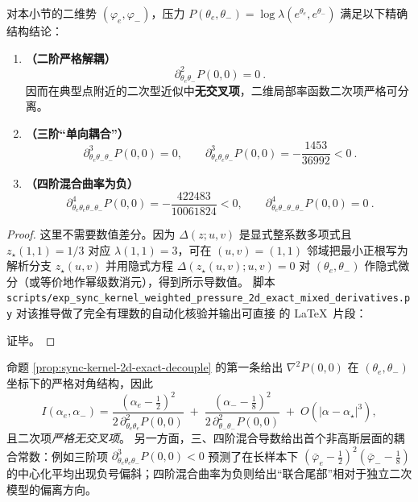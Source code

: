 \begin{proposition}[二维势的二阶严格解耦与首个非高斯混合项]\label{prop:sync-kernel-2d-exact-decouple}
对本小节的二维势 \((\varphi_e,\varphi_-)\)，压力
\(
P(\theta_e,\theta_-)=\log\lambda(e^{\theta_e},e^{\theta_-})
\)
满足以下精确结构结论：
\begin{enumerate}
  \item \textbf{（二阶严格解耦）}
  \[
  \boxed{\ \partial^2_{\theta_e\theta_-}P(0,0)=0\ }.
  \]
  因而在典型点附近的二次型近似中\textbf{无交叉项}，二维局部率函数二次项严格可分离。
  \item \textbf{（三阶“单向耦合”）}
  \[
  \boxed{\ \partial^3_{\theta_e\theta_-\theta_-}P(0,0)=0,\qquad
  \partial^3_{\theta_e\theta_e\theta_-}P(0,0)=-\frac{1453}{36992}<0\ }.
  \]
  \item \textbf{（四阶混合曲率为负）}
  \[
  \boxed{\ \partial^4_{\theta_e\theta_e\theta_-\theta_-}P(0,0)=-\frac{422483}{10061824}<0,\qquad
  \partial^4_{\theta_e\theta_-\theta_-\theta_-}P(0,0)=0\ }.
  \]
\end{enumerate}
\end{proposition}

\begin{proof}
这里不需要数值差分。因为 \(\Delta(z;u,v)\) 是显式整系数多项式且
\(
z_\star(1,1)=1/3
\)
对应 \(\lambda(1,1)=3\)，可在 \((u,v)=(1,1)\) 邻域把最小正根写为解析分支
\(
z_\star(u,v)
\)
并用隐式方程 \(\Delta(z_\star(u,v);u,v)=0\) 对 \((\theta_e,\theta_-)\) 作隐式微分（或等价地作幂级数消元），得到所示导数值。
脚本 \texttt{scripts/exp\_sync\_kernel\_weighted\_pressure\_2d\_exact\_mixed\_derivatives.py} 对该推导做了完全有理数的自动化核验并输出可直接 \verb|| 的 \LaTeX\ 片段：

证毕。
\end{proof}

\begin{remark}\label{rem:sync-kernel-2d-nongaussian-coupling}
命题 \ref{prop:sync-kernel-2d-exact-decouple} 的第一条给出
\(
\nabla^2 P(0,0)
\)
在 \((\theta_e,\theta_-)\) 坐标下的严格对角结构，因此
\[
I(\alpha_e,\alpha_-)
=\frac{(\alpha_e-\frac12)^2}{2\,\partial^2_{\theta_e\theta_e}P(0,0)}
\;+\;
\frac{(\alpha_--\frac18)^2}{2\,\partial^2_{\theta_-\theta_-}P(0,0)}
\;+\;O(|\alpha-\alpha_\star|^3),
\]
且二次项\emph{严格无交叉项}。
另一方面，三、四阶混合导数给出首个非高斯层面的耦合常数：例如三阶项
\(
\partial^3_{\theta_e\theta_e\theta_-}P(0,0)<0
\)
预测了在长样本下
\(
(\bar\varphi_e-\tfrac12)^2(\bar\varphi_- -\tfrac18)
\)
的中心化平均出现负号偏斜；四阶混合曲率为负则给出“联合尾部”相对于独立二次模型的偏离方向。
\end{remark}

